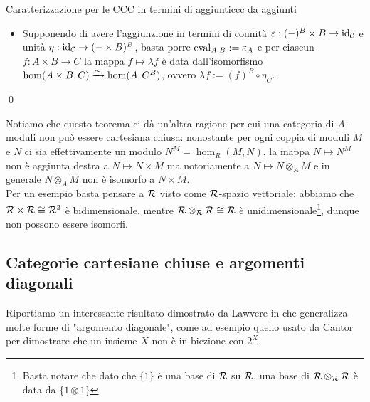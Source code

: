 \documentclass[openany]{book}
\renewcommand\C{\mc{C}}
\begin{document}
\begin{theorem}{Caratterizzazione per le CCC in termini di aggiunti}{ccc da aggiunti}
\begin{enumerate}
\begin{itemize}
                \[\{\eval_{A,B} : A^B \times B \to A \}_{A \in \ob\C} =: \{ \varepsilon_A \}_{A \in \ob\C}  \]
                Definisce la counità di un'aggiunzione, garantendo per universalità l'esistenza dell'unità $\eta$.
            \item Supponendo di avere l'aggiunzione in termini di counità $\varepsilon: (-)^B\times B \to \id_\C$ e unità $\eta : \id_\C \to (-\times B)^B$, basta porre $\operatorname{eval}_{A,B} := \varepsilon_A $ e per ciascun $f : A\times B \to C$ la mappa $f \mapsto \lambda f$ è data dall'isomorfismo $\hom(A\times B, C)\xrightarrow{\sim} \hom(A, C^B)$, ovvero $\lambda f := (f)^B \circ \eta_C$.
        \end{itemize}
    \end{enumerate}
    \qed
\end{theorem}

Notiamo che questo teorema ci dà un'altra ragione per cui una categoria di $A$-moduli non può essere cartesiana chiusa: nonostante per ogni coppia di moduli $M$ e $N$ ci sia effettivamente un modulo $N^M = \hom_R(M,N)$, la mappa $N\mapsto N^M$ non è aggiunta destra a $N\mapsto N\times M$ ma notoriamente a $N\mapsto N \otimes_A M$ e in generale $N\otimes_A M$ non è isomorfo a $N\times M$.\\
Per un esempio basta pensare a $\mathcal{R}$ visto come $\mathcal{R}$-spazio vettoriale: abbiamo che $\mathcal{R}\times\mathcal{R} \cong \mathcal{R}^2$ è bidimensionale, mentre $\mathcal{R}\otimes_{\mathcal{R}} \mathcal{R} \cong \mathcal{R}$ è unidimensionale\footnote{Basta notare che dato che $\{1\}$ è una base di $\mathcal{R}$ su $\mathcal{R}$, una base di $\mathcal{R}\otimes_{\mathcal{R}} \mathcal{R}$ è data da $\{1\otimes 1\}$}, dunque non possono essere isomorfi.

\subsection{Categorie cartesiane chiuse e argomenti diagonali}

Riportiamo un interessante risultato dimostrato da Lawvere in \cite{Lawvere1969} che generalizza molte forme di "argomento diagonale", come ad esempio quello usato da Cantor per dimostrare che un insieme $X$ non è in biezione con $2^X$.
\end{document}
